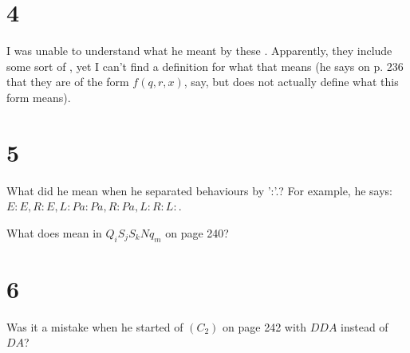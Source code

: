 \documentclass{article}
\theoremstyle{definition}
\newcommand{\?}{\stackrel{?}{=}}
\begin{document}
\section*{4}
I was unable to understand what he meant by these . Apparently, they include some sort of , yet I can't find a definition 
for what that means (he says on p. 236 that they are of the form $f(q,r,x)$, say, but does not actually define what this form means).

\section*{5}
What did he mean when he separated behaviours by ':'.? For example, he says: $E :E,R:E,L:Pa: Pa, R: Pa, L:R:L:$.

What does  mean in $Q_iS_jS_kNq_m$ on page 240?

\section*{6}

Was it a mistake when he started of $(C_2)$ on page 242 with $DDA$ instead of $DA$?
\end{document}
